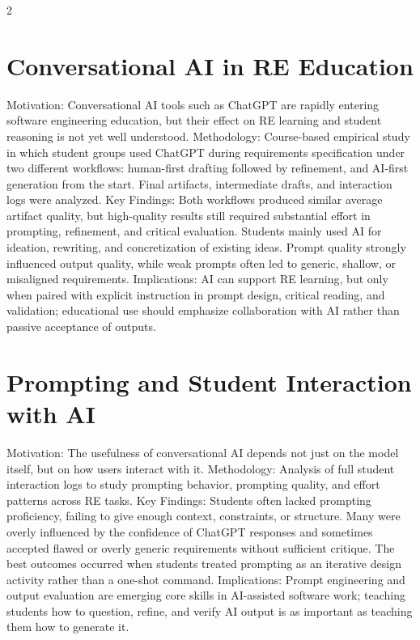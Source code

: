 \documentclass[8pt,a4paper]{extarticle}
\begin{document}
\begin{multicols*}{2}
    \section{Conversational AI in RE Education}
    Motivation: Conversational AI tools such as ChatGPT are rapidly entering software engineering education, but their effect on RE learning and student reasoning is not yet well understood. Methodology: Course-based empirical study in which student groups used ChatGPT during requirements specification under two different workflows: human-first drafting followed by refinement, and AI-first generation from the start. Final artifacts, intermediate drafts, and interaction logs were analyzed. Key Findings: Both workflows produced similar average artifact quality, but high-quality results still required substantial effort in prompting, refinement, and critical evaluation. Students mainly used AI for ideation, rewriting, and concretization of existing ideas. Prompt quality strongly influenced output quality, while weak prompts often led to generic, shallow, or misaligned requirements. Implications: AI can support RE learning, but only when paired with explicit instruction in prompt design, critical reading, and validation; educational use should emphasize collaboration with AI rather than passive acceptance of outputs.

    \section{Prompting and Student Interaction with AI}
    Motivation: The usefulness of conversational AI depends not just on the model itself, but on how users interact with it. Methodology: Analysis of full student interaction logs to study prompting behavior, prompting quality, and effort patterns across RE tasks. Key Findings: Students often lacked prompting proficiency, failing to give enough context, constraints, or structure. Many were overly influenced by the confidence of ChatGPT responses and sometimes accepted flawed or overly generic requirements without sufficient critique. The best outcomes occurred when students treated prompting as an iterative design activity rather than a one-shot command. Implications: Prompt engineering and output evaluation are emerging core skills in AI-assisted software work; teaching students how to question, refine, and verify AI output is as important as teaching them how to generate it.


\end{multicols*}
\end{document}
